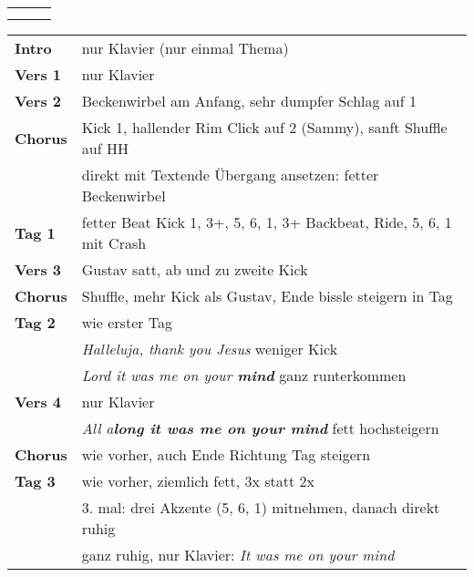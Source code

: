 


\begin{tabular}{p{0.6cm}p{12cm}p{1.4cm}}
	\rowcolor{cyan} \myRow{\thesongnumber} & \myRow{Me on Your Mind} & \myRow{48t} \\
	                                       &                         &             \\
\end{tabular}

\begin{tabular}{p{1.6cm}l}
	\textbf{Intro}  & nur Klavier (nur einmal Thema)                                        \\
	\textbf{Vers 1} & nur Klavier                                                           \\
	\textbf{Vers 2} & Beckenwirbel am Anfang, sehr dumpfer Schlag auf 1                     \\
	\textbf{Chorus} & Kick 1, hallender Rim Click auf 2 (Sammy), sanft Shuffle auf HH       \\
	                & direkt mit Textende Übergang ansetzen: fetter Beckenwirbel            \\
	\textbf{Tag 1}  & fetter Beat Kick 1, 3+, 5, 6, 1, 3+ Backbeat, Ride, 5, 6, 1 mit Crash \\
	\textbf{Vers 3} & Gustav satt, ab und zu zweite Kick                                    \\
	\textbf{Chorus} & Shuffle, mehr Kick als Gustav, Ende bissle steigern in Tag            \\
	\textbf{Tag 2}  & wie erster Tag                                                        \\
	                & \textit{Halleluja, thank you Jesus} weniger Kick                      \\
	                & \textit{Lord it was me on your \textbf{mind}} ganz runterkommen       \\
	\textbf{Vers 4} & nur Klavier                                                           \\
	                & \textit{All a\textbf{long it was me on your mind}} fett hochsteigern  \\
	\textbf{Chorus} & wie vorher, auch Ende Richtung Tag steigern                           \\
	\textbf{Tag 3}  & wie vorher, ziemlich fett, 3x statt 2x                                \\
	                & 3. mal: drei Akzente (5, 6, 1) mitnehmen, danach direkt ruhig         \\
	                & ganz ruhig, nur Klavier: \textit{It was me on your mind}              \\
\end{tabular}
